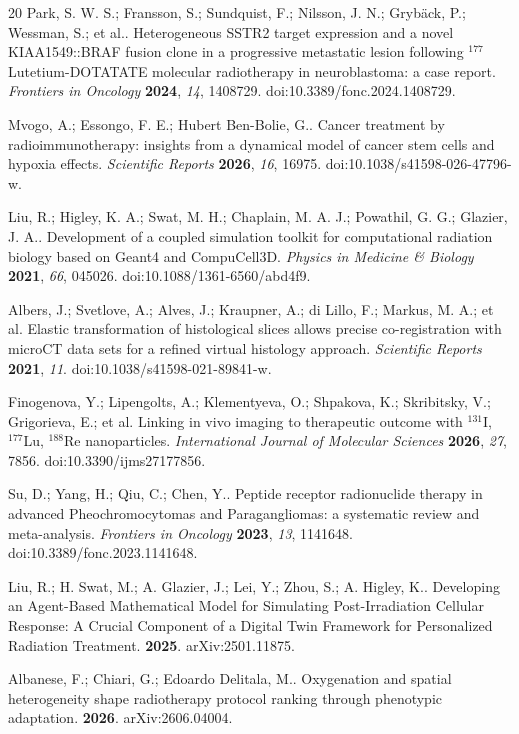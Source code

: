 \documentclass[11pt]{article}
\begin{document}
\begin{thebibliography}{20}
 Park, S. W. S.; Fransson, S.; Sundquist, F.; Nilsson, J. N.; Grybäck, P.; Wessman, S.; et al.. Heterogeneous SSTR2 target expression and a novel KIAA1549::BRAF fusion clone in a progressive metastatic lesion following $^{177}$Lutetium-DOTATATE molecular radiotherapy in neuroblastoma: a case report. \textit{Frontiers in Oncology} \textbf{2024}, \textit{14}, 1408729. doi:10.3389/fonc.2024.1408729.

 Mvogo, A.; Essongo, F. E.; Hubert Ben-Bolie, G.. Cancer treatment by radioimmunotherapy: insights from a dynamical model of cancer stem cells and hypoxia effects. \textit{Scientific Reports} \textbf{2026}, \textit{16}, 16975. doi:10.1038/s41598-026-47796-w.

 Liu, R.; Higley, K. A.; Swat, M. H.; Chaplain, M. A. J.; Powathil, G. G.; Glazier, J. A.. Development of a coupled simulation toolkit for computational radiation biology based on Geant4 and CompuCell3D. \textit{Physics in Medicine \& Biology} \textbf{2021}, \textit{66}, 045026. doi:10.1088/1361-6560/abd4f9.

 Albers, J.; Svetlove, A.; Alves, J.; Kraupner, A.; di Lillo, F.; Markus, M. A.; et al. Elastic transformation of histological slices allows precise co-registration with microCT data sets for a refined virtual histology approach. \textit{Scientific Reports} \textbf{2021}, \textit{11}. doi:10.1038/s41598-021-89841-w.

 Finogenova, Y.; Lipengolts, A.; Klementyeva, O.; Shpakova, K.; Skribitsky, V.; Grigorieva, E.; et al. Linking in vivo imaging to therapeutic outcome with $^{131}$I, $^{177}$Lu, $^{188}$Re nanoparticles. \textit{International Journal of Molecular Sciences} \textbf{2026}, \textit{27}, 7856. doi:10.3390/ijms27177856.

 Su, D.; Yang, H.; Qiu, C.; Chen, Y.. Peptide receptor radionuclide therapy in advanced Pheochromocytomas and Paragangliomas: a systematic review and meta-analysis. \textit{Frontiers in Oncology} \textbf{2023}, \textit{13}, 1141648. doi:10.3389/fonc.2023.1141648.

 Liu, R.; H. Swat, M.; A. Glazier, J.; Lei, Y.; Zhou, S.; A. Higley, K.. Developing an Agent-Based Mathematical Model for Simulating Post-Irradiation Cellular Response: A Crucial Component of a Digital Twin Framework for Personalized Radiation Treatment. \textbf{2025}. arXiv:2501.11875.

 Albanese, F.; Chiari, G.; Edoardo Delitala, M.. Oxygenation and spatial heterogeneity shape radiotherapy protocol ranking through phenotypic adaptation. \textbf{2026}. arXiv:2606.04004.


\end{thebibliography}
\end{document}
